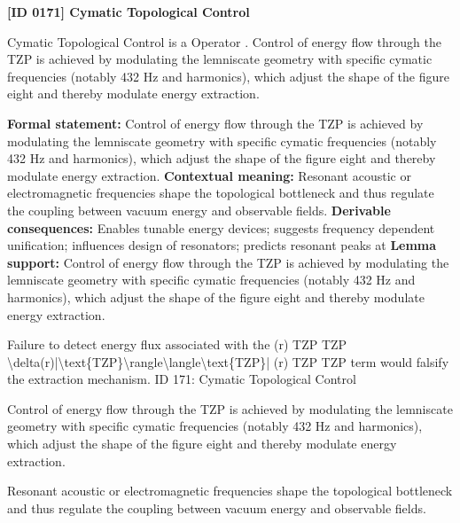 \clearpage
\noindent\textbf{[ID 0171] Cymatic Topological Control}\par
\vspace{0.35em}
\begingroup\small
{}
Cymatic Topological Control is a Operator  . Control of energy flow through the TZP is achieved by modulating the lemniscate geometry with specific cymatic frequencies (notably 432 Hz and harmonics), which adjust the shape of the figure eight and thereby modulate energy extraction.  

\begingroup\footnotesize\setlength{\emergencystretch}{3em}\sloppy
\textbf{Formal statement:} Control of energy flow through the TZP is achieved by modulating the lemniscate geometry with specific cymatic frequencies (notably 432 Hz and harmonics), which adjust the shape of the figure eight and thereby modulate energy extraction.  
\textbf{Contextual meaning:} Resonant acoustic or electromagnetic frequencies shape the topological bottleneck and thus regulate the coupling between vacuum energy and observable fields.  
\textbf{Derivable consequences:} Enables tunable energy devices; suggests frequency dependent unification; influences design of resonators; predicts resonant peaks at
\textbf{Lemma support:} Control of energy flow through the TZP is achieved by modulating the lemniscate geometry with specific cymatic frequencies (notably 432 Hz and harmonics), which adjust the shape of the figure eight and thereby modulate energy extraction.  \par
\endgroup

Failure to detect energy flux associated with the  (r) TZP  TZP \textbackslash{}delta(r)|\textbackslash{}text\{TZP\}\textbackslash{}rangle\textbackslash{}langle\textbackslash{}text\{TZP\}| (r) TZP  TZP  term would falsify the extraction mechanism. ID 171: Cymatic Topological Control

Control of energy flow through the TZP is achieved by modulating the lemniscate geometry with specific cymatic frequencies (notably 432 Hz and harmonics), which adjust the shape of the figure eight and thereby modulate energy extraction.  

Resonant acoustic or electromagnetic frequencies shape the topological bottleneck and thus regulate the coupling between vacuum energy and observable fields.  
\endgroup

